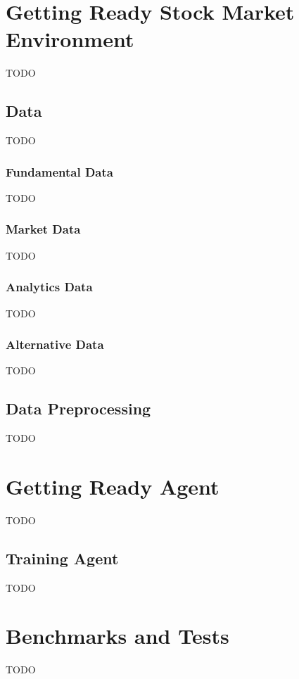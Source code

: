 

\chapter{Getting Ready Stock Market Environment}
TODO


\section{Data}
TODO

\subsection{Fundamental Data}
TODO

\subsection{Market Data}
TODO

\subsection{Analytics Data}
TODO

\subsection{Alternative Data}
TODO


\section{Data Preprocessing}
TODO



\chapter{Getting Ready Agent}
TODO


\section{Training Agent}
TODO



\chapter{Benchmarks and Tests}
TODO

\subsection{}
